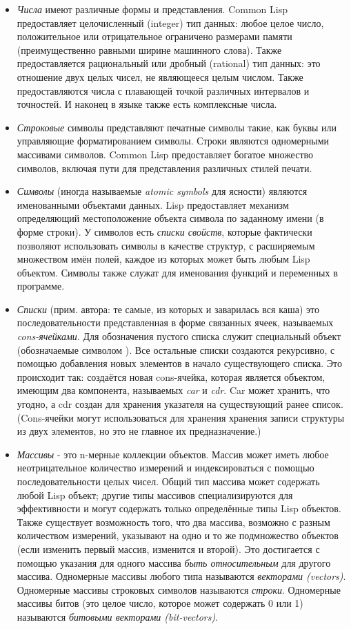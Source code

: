 \begin{itemize}
\item
\emph{Числа} имеют различные формы и представления. Common Lisp
предоставляет целочисленный (integer) тип данных: любое целое
число, положительное или отрицательное ограничено размерами памяти
(преимущественно равными ширине машинного слова). Также
предоставляется рациональный или дробный (rational) тип данных:
это отношение двух целых чисел, не являющееся целым числом. Также
предоставляются числа с плавающей точкой различных интервалов и
точностей. И наконец в языке также есть комплексные числа. 

\item
\emph{Строковые} символы представляют печатные символы такие, как
буквы или управляющие форматированием символы. Строки являются
одномерными массивами символов. Common Lisp предоставляет богатое
множество символов, включая пути для представления различных
стилей печати. 

\item
\emph{Символы} (иногда называемые \emph{atomic symbols} для ясности)
являются именованными объектами данных. Lisp предоставляет
механизм определяющий местоположение объекта символа по заданному
имени (в форме строки). У символов есть \emph{списки свойств},
которые фактически позволяют использовать символы в качестве
структур, с расширяемым множеством имён полей, каждое из которых
может быть любым Lisp объектом. Символы также служат для
именования функций и переменных в программе. 

\item
\emph{Списки} (прим. автора: те самые, из которых и заварилась вся
каша) это последовательности представленная в форме связанных
ячеек, называемых \emph{cons-ячейками}. Для обозначения пустого
списка служит специальный объект (обозначаемые символом
{\nil}). Все остальные списки создаются рекурсивно, с помощью
добавления новых элементов в начало существующего списка. Это
происходит так: создаётся новая cons-ячейка, которая является
объектом, имеющим два компонента, называемых \emph{car} и {\it
cdr}. Car может хранить, что угодно, а cdr создан для хранения
указателя на существующий ранее список. (Cons-ячейки могут
использоваться для хранения хранения записи структуры из двух
элементов, но это не главное их предназначение.) 

\item
\emph{Массивы} - это n-мерные коллекции объектов. Массив может
иметь любое неотрицательное количество измерений и индексироваться
с помощью последовательности целых чисел. Общий тип массива может
содержать любой Lisp объект; другие типы массивов специализируются
для эффективности и могут содержать только определённые типы Lisp
объектов. Также существует возможность того, что два массива,
возможно с разным количеством измерений, указывают на одно и то же
подмножество объектов (если изменить первый массив, изменится и
второй). Это достигается с помощью указания для одного массива
\emph{быть относительным} для другого массива. Одномерные массивы
любого типа называются \emph{векторами (vectors)}. Одномерные
массивы строковых символов называются \emph{строки}. Одномерные
массивы битов (это целое число, которое может содержать 0 или 1)
называются \emph{битовыми векторами (bit-vectors)}. 


\end{itemize}
